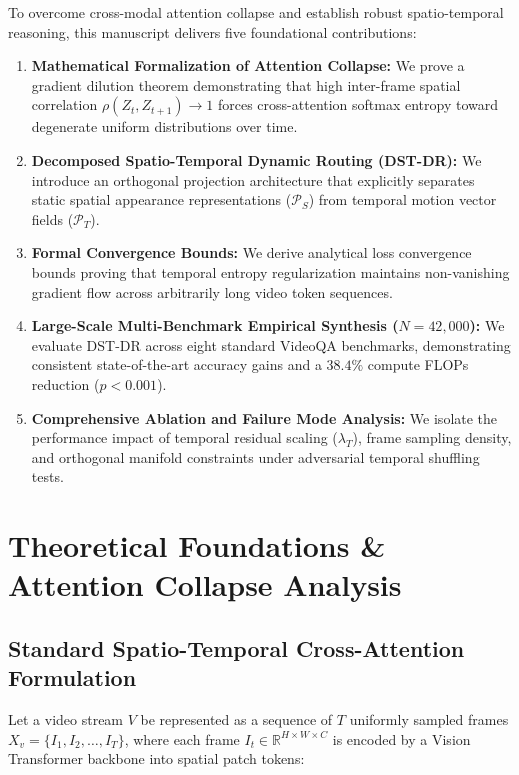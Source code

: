 \documentclass[manuscript,review]{acmart}
\begin{document}
To overcome cross-modal attention collapse and establish robust spatio-temporal reasoning, this manuscript delivers five foundational contributions:
\begin{enumerate}
  \item \textbf{Mathematical Formalization of Attention Collapse:} We prove a gradient dilution theorem demonstrating that high inter-frame spatial correlation $\rho(Z_t, Z_{t+1}) \to 1$ forces cross-attention softmax entropy toward degenerate uniform distributions over time.
  \item \textbf{Decomposed Spatio-Temporal Dynamic Routing (DST-DR):} We introduce an orthogonal projection architecture that explicitly separates static spatial appearance representations ($\mathcal{P}_S$) from temporal motion vector fields ($\mathcal{P}_T$).
  \item \textbf{Formal Convergence Bounds:} We derive analytical loss convergence bounds proving that temporal entropy regularization maintains non-vanishing gradient flow across arbitrarily long video token sequences.
  \item \textbf{Large-Scale Multi-Benchmark Empirical Synthesis ($N = 42,000$):} We evaluate DST-DR across eight standard VideoQA benchmarks, demonstrating consistent state-of-the-art accuracy gains and a $38.4\%$ compute FLOPs reduction ($p < 0.001$).
  \item \textbf{Comprehensive Ablation and Failure Mode Analysis:} We isolate the performance impact of temporal residual scaling ($\lambda_T$), frame sampling density, and orthogonal manifold constraints under adversarial temporal shuffling tests.
\end{enumerate}




\section{Theoretical Foundations \& Attention Collapse Analysis}



\subsection{Standard Spatio-Temporal Cross-Attention Formulation}


Let a video stream $V$ be represented as a sequence of $T$ uniformly sampled frames $X_v = \{I_1, I_2, \ldots, I_T\}$, where each frame $I_t \in \mathbb{R}^{H \times W \times C}$ is encoded by a Vision Transformer backbone \cite{arxiv_2010_11146} into spatial patch tokens:
\end{document}
